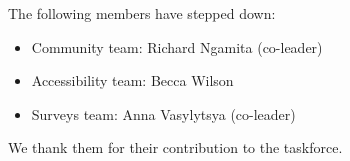 The following members have stepped down:

\begin{itemize}
\tightlist
\item
  Community team: Richard Ngamita (co-leader)
\item
  Accessibility team: Becca Wilson
\item
  Surveys team: Anna Vasylytsya (co-leader)
\end{itemize}

\noindent We thank them for their contribution to the taskforce.



\address{%
Heather Turner\\
University of Warwick\\%
UK\\
%
%
%
\href{mailto:Heather.Turner@R-Project.org}{\nolinkurl{Heather.Turner@R-Project.org}}%
}
